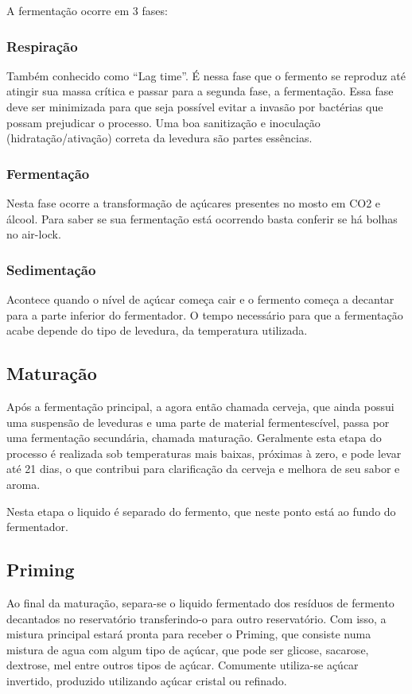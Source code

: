 A fermentação ocorre em 3 fases:

\subsubsection{Respiração}

Também conhecido como “Lag time”. É nessa fase que o fermento se reproduz até atingir sua massa crítica e passar para a segunda fase, a fermentação. Essa fase deve ser minimizada para que seja possível evitar a invasão por bactérias que possam prejudicar o processo. Uma boa sanitização e inoculação (hidratação/ativação) correta da levedura são partes essências.

\subsubsection{Fermentação}
Nesta fase ocorre a transformação de açúcares presentes no mosto em CO2 e álcool. Para saber se sua fermentação está ocorrendo basta conferir se há bolhas no air-lock.

\subsubsection{Sedimentação}

Acontece quando o nível de açúcar começa cair e o fermento começa a decantar para a parte inferior do fermentador. O tempo necessário para que a fermentação acabe depende do tipo de levedura, da temperatura utilizada.

\subsection{Maturação}

Após a fermentação principal, a agora então chamada cerveja, que ainda possui uma suspensão de leveduras e uma parte de material fermentescível, passa por uma fermentação secundária, chamada maturação. Geralmente esta etapa do processo é realizada sob temperaturas mais baixas, próximas à zero, e pode levar até 21 dias, o que contribui para clarificação da cerveja e melhora de seu sabor e aroma.

Nesta etapa o liquido é separado do fermento, que neste ponto está ao fundo do fermentador.

\subsection{Priming}
Ao final da maturação, separa-se o liquido fermentado dos resíduos de fermento decantados no reservatório transferindo-o para outro reservatório. Com isso, a mistura principal estará pronta para receber o Priming, que consiste numa mistura de agua com algum tipo de açúcar, que pode ser glicose, sacarose, dextrose, mel entre outros tipos de açúcar. Comumente utiliza-se açúcar invertido, produzido utilizando açúcar cristal ou refinado.

